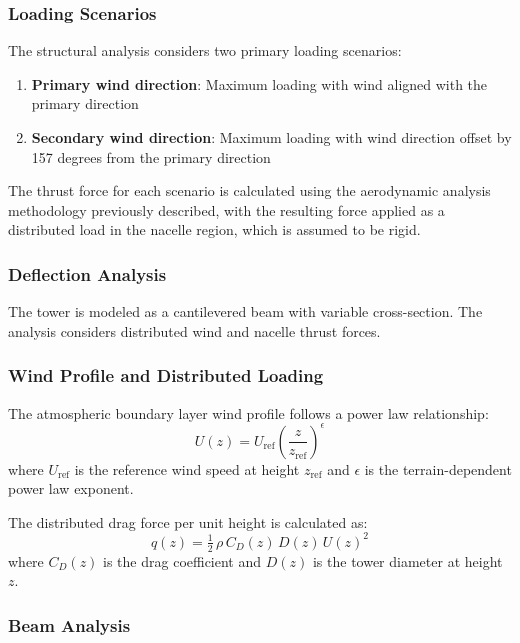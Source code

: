 \documentclass[11pt]{article}
\begin{document}
\subsubsection{Loading Scenarios}

The structural analysis considers two primary loading scenarios:
\begin{enumerate}
    \item \textbf{Primary wind direction}: Maximum loading with wind aligned with the primary direction
    \item \textbf{Secondary wind direction}: Maximum loading with wind direction offset by 157 degrees from the primary direction
\end{enumerate}

The thrust force for each scenario is calculated using the aerodynamic analysis methodology previously described, with the resulting force applied as a distributed load in the nacelle region, which is assumed to be rigid.

\subsubsection{Deflection Analysis}

The tower is modeled as a cantilevered beam with variable cross-section. The analysis considers distributed wind and nacelle thrust forces.

\subsubsection{Wind Profile and Distributed Loading}

The atmospheric boundary layer wind profile follows a power law relationship:
\begin{equation}
 U(z) = U_{\text{ref}}\left(\frac{z}{z_{\text{ref}}}\right)^{\epsilon}
\label{eq:wind_profile}
\end{equation}
where $U_{\text{ref}}$ is the reference wind speed at height $z_{\text{ref}}$ and $\epsilon$ is the terrain-dependent power law exponent.

The distributed drag force per unit height is calculated as:
\begin{equation}
 q(z) = \tfrac{1}{2}\,\rho\,C_D(z)\,D(z)\,U(z)^2
\label{eq:distributed_drag}
\end{equation}
where $C_D(z)$ is the drag coefficient and $D(z)$ is the tower diameter at height $z$.

\subsubsection{Beam Analysis}
\end{document}
